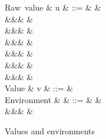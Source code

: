 \begin{figure}
\begin{syntaxfig}
\mbox{Raw value}
&
u
&
::=
&
\exTrue \mid \exFalse
&
\\
&&&
&
\\
&&&
\exPrim{\phi}
&
\\
&&&
&
\\
&&&
&
\\
&&&
\exNil
&
\\
&&&
&
\\[2mm]
\mbox{Value}
&
v
&
::=
&
\\[2mm]
\mbox{Environment}
&
\rho
&
::=
&
\envEmpty
&
\\
&&&
&
\end{syntaxfig}
\caption{Values and environments}
\end{figure}
